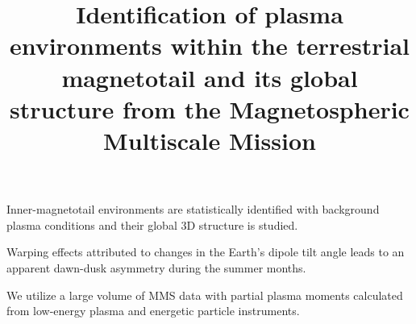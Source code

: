 \documentclass[draft]{agujournal2019}
\begin{document}
\title{
    Identification of plasma environments within the terrestrial magnetotail and its global structure from the Magnetospheric Multiscale Mission
}


\begin{keypoints}

\item Inner-magnetotail environments are statistically identified with background plasma conditions and their global 3D structure is studied.

\item Warping effects attributed to changes in the Earth's dipole tilt angle leads to an apparent dawn-dusk asymmetry during the summer months.

\item We utilize a large volume of MMS data with partial plasma moments calculated from low-energy plasma and energetic particle instruments.

\end{keypoints}
\end{document}
